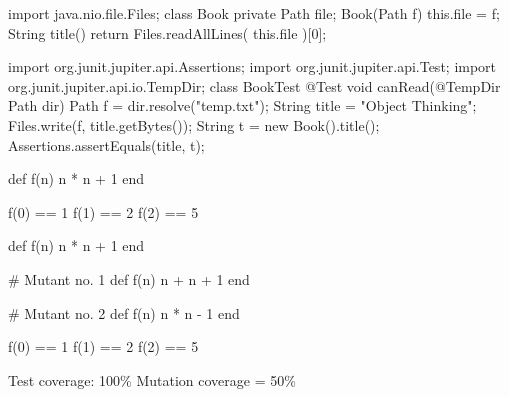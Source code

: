 \documentclass{article}
\begin{document}
\clearpage\begin{innoWide}{2}\small
\begin{ffcode}
import java.nio.file.Files;
class Book {
  private Path file;
  Book(Path f) {
    this.file = f;
  }
  String title() {
    return Files.readAllLines(
      this.file
    )[0];
  }
}
\end{ffcode}
\par\columnbreak
\begin{ffcode}
import org.junit.jupiter.api.Assertions;
import org.junit.jupiter.api.Test;
import org.junit.jupiter.api.io.TempDir;
class BookTest {
  @Test
  void canRead(@TempDir Path dir) {
    Path f = dir.resolve("temp.txt");
    String title = "Object Thinking";
    Files.write(f, title.getBytes());
    String t = new Book().title();
    Assertions.assertEquals(title, t);
  }
}
\end{ffcode}
\end{innoWide}\clearpage




\clearpage
{}
\begin{innoWide}{2}\small
\begin{ffcode}
def f(n)
  n * n + 1
end
\end{ffcode}
\par\columnbreak
\begin{ffcode}
f(0) == 1
f(1) == 2
f(2) == 5
\end{ffcode}
\end{innoWide}\clearpage

\clearpage
{}
\begin{innoWide}{2}\small
\begin{ffcode}
def f(n)
  n * n + 1
end

# Mutant no. 1
def f(n)
  n + n + 1
end

# Mutant no. 2
def f(n)
  n * n - 1
end
\end{ffcode}
\par\columnbreak
\begin{ffcode}
f(0) == 1
f(1) == 2
f(2) == 5
\end{ffcode}

Test coverage: 100\%
Mutation coverage = 50\%
\end{innoWide}\clearpage
\end{document}

